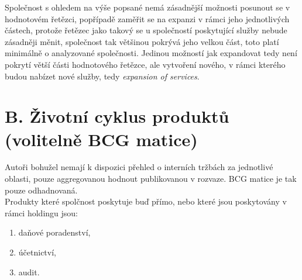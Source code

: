 

Společnost s ohledem na výše popsané nemá zásadnější možnosti posunout se v hodnotovém řetězci, popřípadě zaměřit se na expanzi v rámci jeho jednotlivých částech, protože řetězec jako takový se u společností poskytující služby nebude zásadněji měnit, společnost tak většinou pokrývá jeho velkou část, toto platí minimálně o analyzované společnosti. Jedinou možností jak expandovat tedy není pokrytí větší části hodnotového řetězce, ale vytvoření nového, v rámci kterého budou nabízet nové služby, tedy \textit{expansion of services}.


\newpage

\section*{B. Životní cyklus produktů (volitelně BCG matice)}
\label{sec:Zivotni cyklus produktu}

Autoři bohužel nemají k dispozici přehled o interních tržbách za jednotlivé oblasti, pouze aggregovanou hodnout publikovanou v rozvaze. BCG matice je tak pouze odhadnovaná.\\

Produkty které spolčnost poskytuje buď přímo, nebo které jsou poskytovány v rámci holdingu jsou:\\

\begin{enumerate}
	\item daňové poradenství,
	\item účetnictví,
	\item audit.
\end{enumerate}

